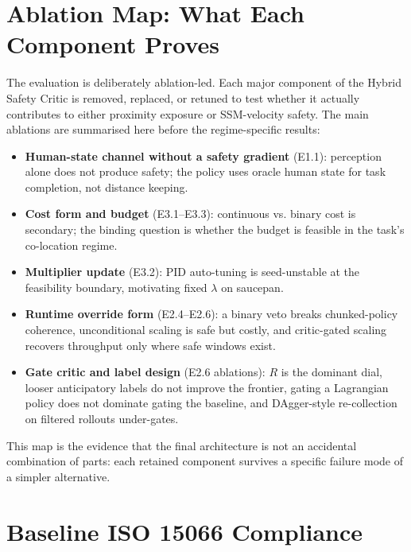 \documentclass[11pt,a4paper]{report}
\begin{document}
\section{Ablation Map: What Each Component Proves}
\label{sec:results:ablation-map}

The evaluation is deliberately ablation-led. Each major component of
the Hybrid Safety Critic is removed, replaced, or retuned to test
whether it actually contributes to either proximity exposure or
SSM-velocity safety. The main ablations are summarised here before the
regime-specific results:
\begin{itemize}[topsep=2pt,itemsep=1pt]
\item \textbf{Human-state channel without a safety gradient} (E1.1):
  perception alone does not produce safety; the policy uses oracle
  human state for task completion, not distance keeping.
\item \textbf{Cost form and budget} (E3.1--E3.3): continuous vs.
  binary cost is secondary; the binding question is whether the budget
  is feasible in the task's co-location regime.
\item \textbf{Multiplier update} (E3.2): PID auto-tuning is
  seed-unstable at the feasibility boundary, motivating fixed
  $\lambda$ on saucepan.
\item \textbf{Runtime override form} (E2.4--E2.6): a binary veto
  breaks chunked-policy coherence, unconditional scaling is safe but
  costly, and critic-gated scaling recovers throughput only where safe
  windows exist.
\item \textbf{Gate critic and label design} (E2.6 ablations):
  $R$ is the dominant dial, looser anticipatory labels do not improve
  the frontier, gating a Lagrangian policy does not dominate gating the
  baseline, and DAgger-style re-collection on filtered rollouts
  under-gates.
\end{itemize}
This map is the evidence that the final architecture is not an
accidental combination of parts: each retained component survives a
specific failure mode of a simpler alternative.



\section{Baseline ISO 15066 Compliance}
\label{sec:results:baseline}
\end{document}
